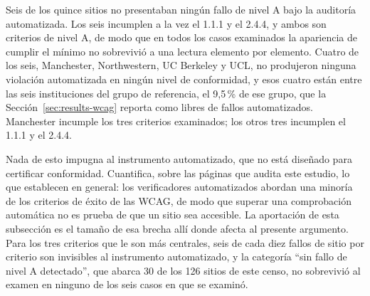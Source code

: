 \documentclass[pdflatex,sn-basic,Numbered,iicol]{sn-jnl}
\theoremstyle{thmstyleone}
\theoremstyle{thmstyletwo}
\theoremstyle{thmstylethree}
\begin{document}
Seis de los quince sitios no presentaban ning\'un fallo de nivel A bajo la auditor\'ia automatizada. Los seis incumplen a la vez el 1.1.1 y el 2.4.4, y ambos son criterios de nivel A, de modo que en todos los casos examinados la apariencia de cumplir el m\'inimo no sobrevivi\'o a una lectura elemento por elemento. Cuatro de los seis, Manchester, Northwestern, UC Berkeley y UCL, no produjeron ninguna violaci\'on automatizada en ning\'un nivel de conformidad, y esos cuatro est\'an entre las seis instituciones del grupo de referencia, el 9,5\,\% de ese grupo, que la Secci\'on~\ref{sec:results-wcag} reporta como libres de fallos automatizados. Manchester incumple los tres criterios examinados; los otros tres incumplen el 1.1.1 y el 2.4.4.

Nada de esto impugna al instrumento automatizado, que no est\'a dise\~nado para certificar conformidad. Cuantifica, sobre las p\'aginas que audita este estudio, lo que \citet{fischer2025coverage} establecen en general: los verificadores automatizados abordan una minor\'ia de los criterios de \'exito de las WCAG, de modo que superar una comprobaci\'on autom\'atica no es prueba de que un sitio sea accesible. La aportaci\'on de esta subsecci\'on es el tama\~no de esa brecha all\'i donde afecta al presente argumento. Para los tres criterios que le son m\'as centrales, seis de cada diez fallos de sitio por criterio son invisibles al instrumento automatizado, y la categor\'ia ``sin fallo de nivel A detectado'', que abarca 30 de los 126 sitios de este censo, no sobrevivi\'o al examen en ninguno de los seis casos en que se examin\'o.
\end{document}
